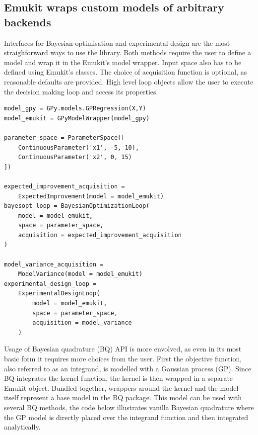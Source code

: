 
\subsection{Emukit wraps custom models of arbitrary backends}

Interfaces for Bayesian optimisation and experimental design are the most straighforward ways to use the library. Both methods require the user to define a model and wrap it in the Emukit's model wrapper. Input space also has to be defined using Emukit's classes. The choice of acquisition function is optional, as reasonable defaults are provided. High level loop objects allow the user to execute the decision making loop and access its properties.

\begin{verbatim}
model_gpy = GPy.models.GPRegression(X,Y)
model_emukit = GPyModelWrapper(model_gpy)

parameter_space = ParameterSpace([
    ContinuousParameter('x1', -5, 10),
    ContinuousParameter('x2', 0, 15)
])

expected_improvement_acquisition =
    ExpectedImprovement(model = model_emukit)
bayesopt_loop = BayesianOptimizationLoop(
    model = model_emukit,
    space = parameter_space,
    acquisition = expected_improvement_acquisition
)

model_variance_acquisition =
    ModelVariance(model = model_emukit)
experimental_design_loop =
    ExperimentalDesignLoop(
        model = model_emukit,
        space = parameter_space,
        acquisition = model_variance
    )
\end{verbatim}

Usage of Bayesian quadrature (BQ) API is more envolved, as even in its most basic form it requires more choices from the user. First the objective function, also referred to as an integrand, is modelled with a Gaussian process (GP). Since BQ integrates the kernel function, the kernel is then wrapped in a separate Emukit object. Bundled together, wrappers around the kernel and the model itself represent a base model in the BQ package. This model can be used with several BQ methods, the code below illustrates vanilla Bayesian quadrature where the GP model is directly placed over the integrand function and then integrated analytically.

